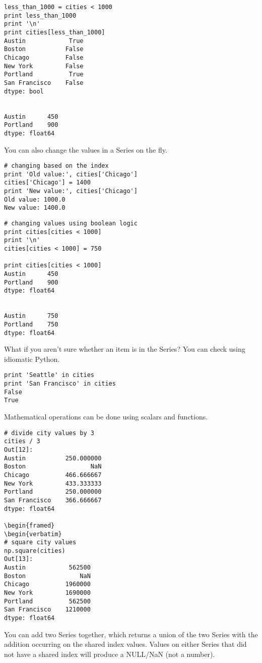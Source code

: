\documentclass[KSmain.tex]{subfiles}
\begin{document}
\begin{framed}
\begin{verbatim}
less_than_1000 = cities < 1000
print less_than_1000
print '\n'
print cities[less_than_1000]
Austin            True
Boston           False
Chicago          False
New York         False
Portland          True
San Francisco    False
dtype: bool


Austin      450
Portland    900
dtype: float64

\end{verbatim}
\end{framed}
You can also change the values in a Series on the fly.

\begin{framed}
\begin{verbatim}
# changing based on the index
print 'Old value:', cities['Chicago']
cities['Chicago'] = 1400
print 'New value:', cities['Chicago']
Old value: 1000.0
New value: 1400.0
\end{verbatim}
\end{framed}

\begin{framed}
\begin{verbatim}
# changing values using boolean logic
print cities[cities < 1000]
print '\n'
cities[cities < 1000] = 750

print cities[cities < 1000]
Austin      450
Portland    900
dtype: float64


Austin      750
Portland    750
dtype: float64
\end{verbatim}
\end{framed}
What if you aren't sure whether an item is in the Series? You can check using idiomatic Python.

\begin{framed}
\begin{verbatim}
print 'Seattle' in cities
print 'San Francisco' in cities
False
True
\end{verbatim}
\end{framed}
Mathematical operations can be done using scalars and functions.

\begin{framed}
\begin{verbatim}
# divide city values by 3
cities / 3
Out[12]:
Austin           250.000000
Boston                  NaN
Chicago          466.666667
New York         433.333333
Portland         250.000000
San Francisco    366.666667
dtype: float64

\begin{framed}
\begin{verbatim}
# square city values
np.square(cities)
Out[13]:
Austin            562500
Boston               NaN
Chicago          1960000
New York         1690000
Portland          562500
San Francisco    1210000
dtype: float64
\end{verbatim}
\end{framed}
You can add two Series together, which returns a union of the two Series with the addition occurring on the shared index values. Values on either Series that did not have a shared index will produce a NULL/NaN (not a number).
\end{document}
